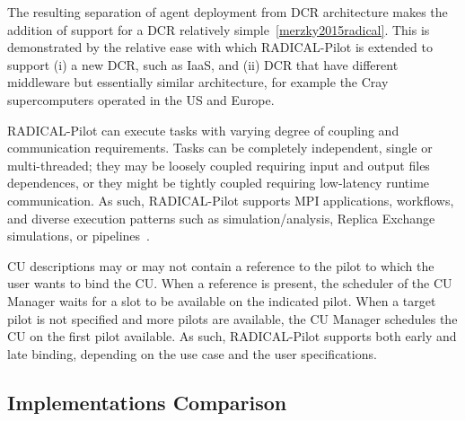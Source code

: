 \documentclass{sig-alternate}
\begin{document}
The resulting separation of agent deployment from DCR architecture makes the
addition of support for a DCR relatively simple~\ref{merzky2015radical}. This is
demonstrated by the relative ease with which RADICAL-Pilot is extended to
support (i) a new DCR, such as IaaS, and (ii) DCR that have different middleware
but essentially similar architecture, for example the Cray supercomputers
operated in the US and Europe.

RADICAL-Pilot can execute tasks with varying degree of coupling and
communication requirements. Tasks can be completely independent, single or
multi-threaded; they may be loosely coupled requiring input and output files
dependences, or they might be tightly coupled requiring low-latency runtime
communication. As such, RADICAL-Pilot supports MPI applications, workflows, and
diverse execution patterns such as simulation/analysis, Replica Exchange
simulations, or pipelines~\cite{emdtoolkit_url}.

CU descriptions may or may not contain a reference to the pilot to which the
user wants to bind the CU. When a reference is present, the scheduler of the CU
Manager waits for a slot to be available on the indicated pilot. When a target
pilot is not specified and more pilots are available, the CU Manager schedules
the CU on the first pilot available. As such, RADICAL-Pilot supports both early
and late binding, depending on the use case and the user specifications.

%
\subsection{Implementations Comparison}
\label{sec:context}



\end{document}
